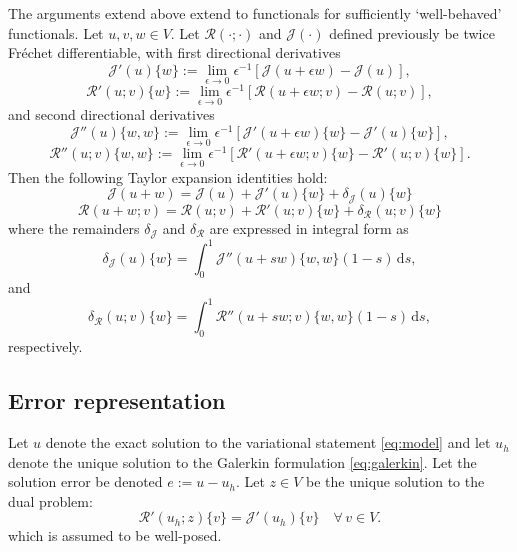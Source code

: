 \documentclass{article}
\newcommand{\R}{\mathcal{R}}
\newcommand{\J}{\mathcal{J}}
\begin{document}
The arguments extend above extend to functionals
for sufficiently `well-behaved' functionals.
Let $u,v,w \in V$.
Let $\R(\cdot; \cdot)$ and $\J(\cdot)$ defined
previously be twice Fr\'{e}chet differentiable,
with first directional derivatives
%
\begin{equation}
\J'(u)\{w\} := \lim_{\epsilon \to 0}
\epsilon^{-1} \left[ \J(u + \epsilon w) - \J(u) \right],
\end{equation}
%
\begin{equation}
\R'(u;v)\{w\} := \lim_{\epsilon \to 0}
\epsilon^{-1} \left[ \R(u + \epsilon w; v) - \R(u;v) \right],
\end{equation}
and second directional derivatives
%
\begin{equation}
\J''(u)\{w,w\} := \lim_{\epsilon \to 0}
\epsilon^{-1} \left[ \J'(u + \epsilon w)\{w\} - \J'(u)\{w\} \right],
\end{equation}
%
\begin{equation}
\R''(u;v)\{w,w\} := \lim_{\epsilon \to 0}
\epsilon^{-1} \left[ \R'(u + \epsilon w; v)\{w\} - \R'(u;v)\{w\} \right].
\end{equation}
Then the following Taylor expansion identities hold:
%
\begin{equation}
\J(u+w) = \J(u) + \J'(u)\{w\} + \delta_{\J}(u)\{w\}
\label{eq:functional_taylor_int}
\end{equation}
%
\begin{equation}
\R(u+w;v) = \R(u;v) + \R'(u;v)\{w\} + \delta_{\R}(u;v)\{w\}
\label{eq:residual_taylor_int}
\end{equation}
%
where the remainders $\delta_{\J}$ and
$\delta_{\R}$ are expressed in integral form as
%
\begin{equation}
\delta_{\J}(u)\{w\} = \int_0^1 \J''(u+sw)\{w,w\}(1-s) \, \text{d} s,
\end{equation}
and
%
\begin{equation}
\delta_{\R}(u;v)\{w\} = \int_0^1 \R''(u+sw;v)\{w,w\}(1-s) \, \text{d} s,
\end{equation}
respectively.

\subsection{Error representation}

Let $u$ denote the exact solution to the
variational statement \eqref{eq:model}
and let $u_h$ denote the unique solution to the Galerkin
formulation \eqref{eq:galerkin}. Let the solution error
be denoted $e := u - u_h$. Let $z \in V$ be the unique
solution to the dual problem:
%
\begin{equation}
\R'(u_h; z)\{v\} = \J'(u_h)\{v\} \quad \forall \, v \in V.
\label{eq:dual}
\end{equation}
%
which is assumed to be well-posed.
\end{document}
